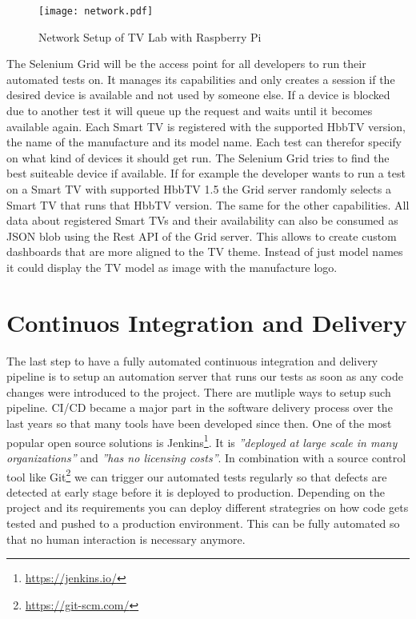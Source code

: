 \vspace{1cm}
\begin{figure}[htb]
  \centering
  \texttt{[image: network.pdf]}\\
  \caption{Network Setup of TV Lab with Raspberry Pi}\label{fig:network}
\end{figure}
\vspace{0.5cm}

The Selenium Grid will be the access point for all developers to run their automated tests on. It
manages its capabilities and only creates a session if the desired device is available and not used
by someone else. If a device is blocked due to another test it will queue up the request and waits
until it becomes available again. Each Smart TV is registered with the supported HbbTV version, the
name of the manufacture and its model name. Each test can therefor specify on what kind of devices
it should get run. The Selenium Grid tries to find the best suiteable device if available. If for
example the developer wants to run a test on a Smart TV with supported HbbTV 1.5 the Grid server
randomly selects a Smart TV that runs that HbbTV version. The same for the other capabilities. All
data about registered Smart TVs and their availability can also be consumed as JSON blob using
the Rest API of the Grid server. This allows to create custom dashboards that are more aligned to
the TV theme. Instead of just model names it could display the TV model as image with the manufacture
logo.

\section{Continuos Integration and Delivery\label{sec:cicd}}

The last step to have a fully automated continuous integration and delivery pipeline is to setup
an automation server that runs our tests as soon as any code changes were introduced to the project.
There are mutliple ways to setup such pipeline. CI/CD became a major part in the software delivery
process over the last years so that many tools have been developed since then. One of the most
popular open source solutions is Jenkins\footnote{\url{https://jenkins.io/}}. It is \textit{''deployed
at large scale in many organizations''}\cite{jenkins} and \textit{''has no licensing costs''}\cite{jenkins}.
In combination with a source control tool like Git\footnote{\url{https://git-scm.com/}} we can
trigger our automated tests regularly so that defects are detected at early stage before it is
deployed to production. Depending on the project and its requirements you can deploy different
strategries on how code gets tested and pushed to a production environment. This can be fully automated
so that no human interaction is necessary anymore.

